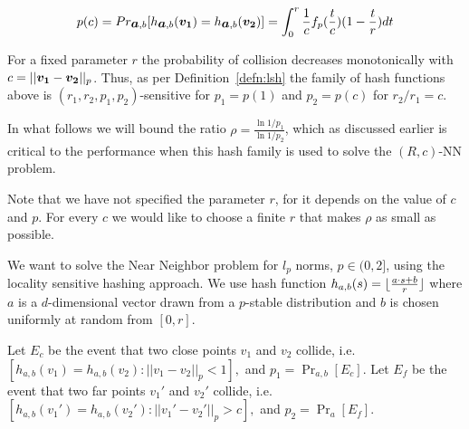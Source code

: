 \documentclass[12pt]{article}
\newcommand{\bm}[1]{\mbox{\boldmath$#1$}}
\begin{document}
$$p(c)=Pr_{\bm{a},b} [h_{\bm{a},b}(\bm{v_1}) = h_{\bm{a},b}(\bm{v_2})] =
\int_0^r \frac{1}{c}
f_p(\frac{t}{c}) (1-\frac{t}{r}) dt$$

For a fixed parameter $r$ the probability of collision decreases
monotonically with $c=||\bm{v_1} - \bm{v_2}||_p$. Thus, as per
Definition~\ref{defn:lsh} the family of hash functions above is $(r_1,
r_2, p_1, p_2)$-sensitive for $p_1 = p(1)$ 
and $p_2 = p(c)$
for $r_2/r_1 = c$.

In what follows we will bound the ratio $\rho=\frac{\ln 1/p_1}{\ln
1/p_2}$, which as discussed earlier is critical to the performance when
this hash family is used to solve the $(R,c)$-NN problem.

Note that we have not specified the parameter $r$, for it depends
on the value of $c$ and $p$. For every $c$ we would like to choose a finite $r$ that
makes $\rho$ as small as possible.

\iffalse
We want to solve the Near Neighbor problem for $l_p$ norms,
$p\in(0,2]$, using the locality sensitive hashing
approach.
We use hash function $h_{a,b}(s)=\lfloor{a \cdot s+b\over r}\rfloor$ where $a$ is a
$d$-dimensional vector drawn from a $p$-stable distribution and
$b$ is chosen uniformly at random from $[0,r]$.

\begin{defn}
Let $E_c$ be the event that two close points $v_1$ and $v_2$ collide,
i.e. $[h_{a,b}(v_1)=h_{a,b}(v_2)  : ||v_1-v_2||_p < 1],$ and $p_1=\Pr_{a,b}[E_c]$.
Let $E_f$ be the event that two far points $v_1'$ and $v_2'$ collide,
i.e. $[h_{a,b}(v_1') = h_{a,b}(v_2') : ||v_1'-v_2'||_p > c],$ and $p_2=\Pr_a[E_f]$.
\end{defn}
\end{document}
